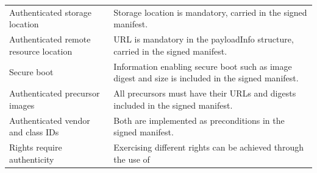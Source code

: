 \documentclass[0-thesis.tex]{subfiles}
\begin{document}
\begin{small}
\begin{longtable}[]{@{}ll@{}}
    \begin{minipage}[t]{0.37\columnwidth}\raggedright\strut
    Authenticated storage location\strut
    \end{minipage} & \begin{minipage}[t]{0.57\columnwidth}\raggedright\strut
    Storage location is mandatory, carried in the signed manifest.\strut
    \end{minipage}\tabularnewline
    \begin{minipage}[t]{0.37\columnwidth}\raggedright\strut
    Authenticated remote resource location\strut
    \end{minipage} & \begin{minipage}[t]{0.57\columnwidth}\raggedright\strut
    URL is mandatory in the payloadInfo structure, carried in the signed
    manifest.\strut
    \end{minipage}\tabularnewline
    \begin{minipage}[t]{0.37\columnwidth}\raggedright\strut
    Secure boot\strut
    \end{minipage} & \begin{minipage}[t]{0.57\columnwidth}\raggedright\strut
    Information enabling secure boot such as image digest and size is
    included in the signed manifest.\strut
    \end{minipage}\tabularnewline
    \begin{minipage}[t]{0.37\columnwidth}\raggedright\strut
    Authenticated precursor images\strut
    \end{minipage} & \begin{minipage}[t]{0.57\columnwidth}\raggedright\strut
    All precursors must have their URLs and digests included in the signed
    manifest.\strut
    \end{minipage}\tabularnewline
    \begin{minipage}[t]{0.37\columnwidth}\raggedright\strut
    Authenticated vendor and class IDs\strut
    \end{minipage} & \begin{minipage}[t]{0.57\columnwidth}\raggedright\strut
    Both are implemented as preconditions in the signed manifest.\strut
    \end{minipage}\tabularnewline
    \begin{minipage}[t]{0.37\columnwidth}\raggedright\strut
    Rights require authenticity\strut
    \end{minipage} & \begin{minipage}[t]{0.57\columnwidth}\raggedright\strut
    Exercising different rights can be achieved through the use of

\end{minipage}
\end{longtable}
\end{small}
\end{document}
